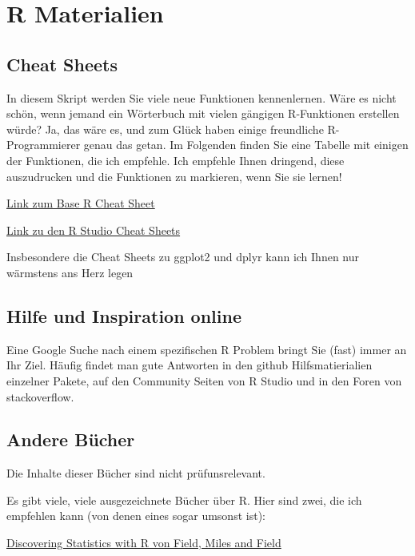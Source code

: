 \documentclass[
]{book}
\begin{document}
\hypertarget{r-materialien}{%
\chapter{R Materialien}\label{r-materialien}}

\hypertarget{cheat-sheets}{%
\section{Cheat Sheets}\label{cheat-sheets}}

In diesem Skript werden Sie viele neue Funktionen kennenlernen. Wäre es nicht schön, wenn jemand ein Wörterbuch mit vielen gängigen R-Funktionen erstellen würde? Ja, das wäre es, und zum Glück haben einige freundliche R-Programmierer genau das getan. Im Folgenden finden Sie eine Tabelle mit einigen der Funktionen, die ich empfehle. Ich empfehle Ihnen dringend, diese auszudrucken und die Funktionen zu markieren, wenn Sie sie lernen!

\href{https://cran.r-project.org/doc/contrib/Short-refcard.pdf}{Link zum Base R Cheat Sheet}

\href{https://www.rstudio.com/resources/cheatsheets/}{Link zu den R Studio Cheat Sheets}

Insbesondere die Cheat Sheets zu ggplot2 und dplyr kann ich Ihnen nur wärmstens ans Herz legen

\hypertarget{hilfe-und-inspiration-online}{%
\section{Hilfe und Inspiration online}\label{hilfe-und-inspiration-online}}

Eine Google Suche nach einem spezifischen R Problem bringt Sie (fast) immer an Ihr Ziel. Häufig findet man gute Antworten in den github Hilfsmatierialien einzelner Pakete, auf den Community Seiten von R Studio und in den Foren von stackoverflow.

\hypertarget{andere-buxfccher}{%
\section{Andere Bücher}\label{andere-buxfccher}}

Die Inhalte dieser Bücher sind nicht prüfunsrelevant.

Es gibt viele, viele ausgezeichnete Bücher über R. Hier sind zwei, die ich empfehlen kann (von denen eines sogar umsonst ist):

\href{https://www.amazon.com/Discovering-Statistics-Using-Andy-Field/dp/1446200469/ref=sr_1_2?ie=UTF8\&qid=1487759316\&sr=8-2\&keywords=statistics+with+r}{Discovering Statistics with R von Field, Miles and Field}
\end{document}

